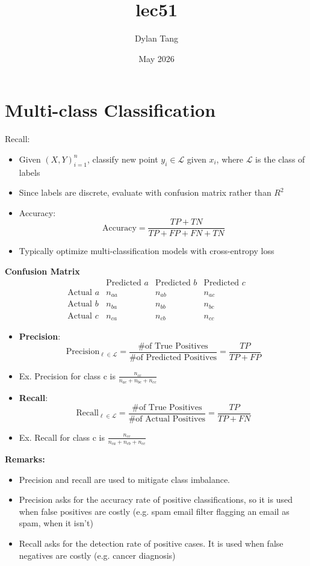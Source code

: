 \documentclass{article}
\title{lec51}
\author{Dylan Tang}
\date{May 2026}
\begin{document}
\maketitle

\section{Multi-class Classification}
Recall: 
\begin{itemize}
    \item Given $(X,Y)_{i=1}^n$, classify new point $y_i \in \mathcal{L}$ given $x_i$, where $\mathcal{L}$ is the class of labels
    \item Since labels are discrete, evaluate with confusion matrix rather than $R^2$
    \item Accuracy: 
    \[
        \text{Accuracy} = \frac{TP + TN}{TP + FP + FN + TN}
    \]
    \item Typically optimize multi-classification models with cross-entropy loss 
\end{itemize}
\textbf{Confusion Matrix}
\[
    \begin{array}{c|ccc}
     & \text{Predicted } a & \text{Predicted } b & \text{Predicted } c \\
    \hline
    \text{Actual } a & n_{aa} & n_{ab} & n_{ac} \\
    \text{Actual } b & n_{ba} & n_{bb} & n_{bc} \\
    \text{Actual } c & n_{ca} & n_{cb} & n_{cc}
    \end{array}
\]
\begin{itemize}
    \item \textbf{Precision}:
    \[
        \text{Precision}_{\ell \in \mathcal{L}} = \frac{\text{\# of True Positives}}{\text{\# of Predicted Positives}} = \frac{TP}{TP + FP}
    \]
    \item Ex. Precision for class c is $\frac{n_{cc}}{n_{ac} + n_{bc} + n_{cc}}$
    \item \textbf{Recall}:
    \[
        \text{Recall}_{\ell \in \mathcal{L}} = \frac{\text{\# of True Positives}}{\text{\# of  Actual Positives}} = \frac{TP}{TP + FN}
    \]
    \item Ex. Recall for class c is $\frac{n_{cc}}{n_{ca} + n_{cb} + n_{cc}}$
\end{itemize}

\textbf{Remarks:}
\begin{itemize}
    \item Precision and recall are used to mitigate class imbalance. 
    \item Precision asks for the accuracy rate of positive classifications, so it is used when false positives are costly (e.g. spam email filter flagging an email as spam, when it isn't)
    \item Recall asks for the detection rate of positive cases. It is used when false negatives are costly (e.g. cancer diagnosis)
\end{itemize}
\end{document}
